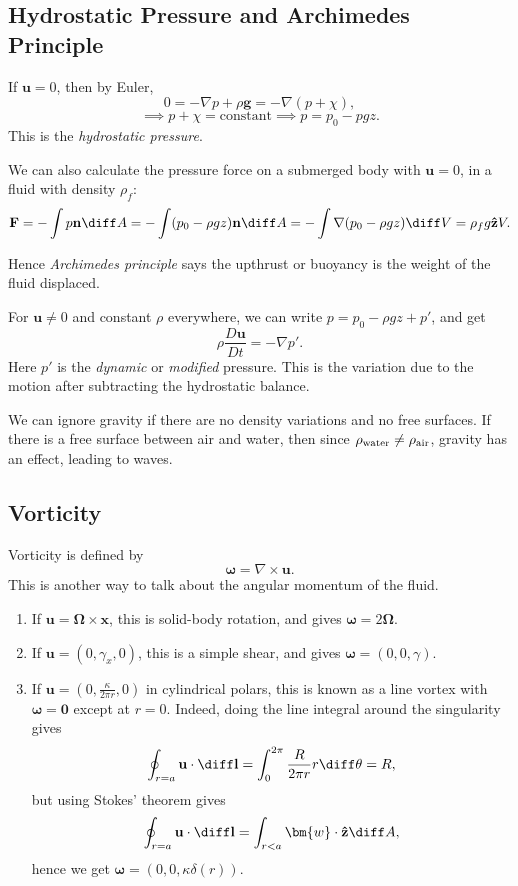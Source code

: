 \documentclass[12pt]{article}
\begin{document}
\subsection{Hydrostatic Pressure and Archimedes Principle}
\label{sub:hydrostatic_pressure_and_archimedes_principle}

If $\mathbf{u} = 0$, then by Euler,
\[
0 = - \nabla p + \rho \mathbf{g} = - \nabla (p + \chi)
,\]
\[
	\implies p + \chi = \mathrm{constant} \implies p = p_0 - pgz
.\]
This is the \emph{hydrostatic pressure}.

We can also calculate the pressure force on a submerged body with $\mathbf{u} = 0$, in a fluid with density $\rho_{f}$:
\begin{align*}
	\mathbf{F} = - \int p \mathbf{n} \diff A = - \int (p_0 - \rho g z) \mathbf{n} \diff A = - \int \nabla (p_0 - \rho g z) \diff V = \rho_{f} g \mathbf{\hat z} V.
\end{align*}

Hence \emph{Archimedes principle} says the upthrust or buoyancy is the weight of the fluid displaced.

For $\mathbf{u} \neq 0$ and constant $\rho$ everywhere, we can write $p = p_0 - \rho g z + p'$, and get
\[
\rho \frac{D \mathbf{u}}{D t} = - \nabla p'
.\]
Here $p'$ is the \emph{dynamic} or \emph{modified} pressure. This is the variation due to the motion after subtracting the hydrostatic balance.

We can ignore gravity if there are no density variations and no free surfaces. If there is a free surface between air and water, then since $\rho_{\rm{water}} \neq \rho_{\rm{air}}$, gravity has an effect, leading to waves.

\subsection{Vorticity}
\label{sub:vorticity}

Vorticity is defined by
\[
\bm{\omega} = \nabla \times \mathbf{u}
.\]
This is another way to talk about the angular momentum of the fluid.

\begin{enumerate}
	\item If $\mathbf{u} = \bm{\Omega} \times \mathbf{x}$, this is solid-body rotation, and gives $\bm{\omega} = 2 \bm{\Omega}$.
	\item If $\mathbf{u} = (0, \gamma_x, 0)$, this is a simple shear, and gives $\bm{\omega} = (0, 0, \gamma)$.
	\item If $\mathbf{u} = (0, \frac{\kappa}{2 \pi r}, 0)$ in cylindrical polars, this is known as a line vortex with $\bm{\omega} = \mathbf{0}$ except at $r = 0$. Indeed, doing the line integral around the singularity gives
		\[
		\oint_{r = a} \mathbf{u} \cdot \diff \mathbf{l} = \int_{0}^{2 \pi} \frac{R}{2 \pi r} r \diff \theta = R
		,\]
		but using Stokes' theorem gives
		\[
		\oint_{r = a} \mathbf{u} \cdot \diff \mathbf{l} = \int_{r < a} \bm{w} \cdot \mathbf{\hat z} \diff A
		,\]
		hence we get $\bm{\omega} = (0, 0, \kappa \delta(r))$.
\end{enumerate}
\end{document}
